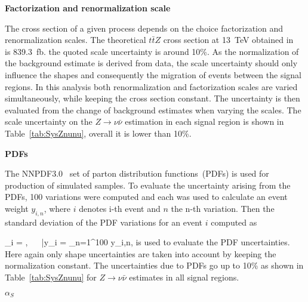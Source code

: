 \textbf{Factorization and renormalization scale}

The cross section of a given process depends on the choice factorization and renormalization scales. The theoretical $t\bar{t}Z$ cross section at 13~TeV obtained in~\cite{deFlorian:2016spz} is 839.3~fb. the quoted scale uncertainty is around 10\%. As the normalization of the background estimate is derived from data, the scale uncertainty should only influence the shapes and consequently the migration of events between the signal regions. In this analysis both renormalization and factorization scales are varied simultaneously, while keeping the cross section constant. The uncertainty is then evaluated from the change of background estimates when varying the scales. The scale uncertainty on the $Z \to \nu \bar{\nu}$ estimation in each signal region is shown in Table~\ref{tab:SysZnunu}, overall it is lower than 10\%.


\textbf{PDFs}


The NNPDF3.0~\cite{Ball:2014uwa} set of parton distribution functions~(PDFs) is used for production of simulated samples. To evaluate the uncertainty arising from the PDFs, 100 variations were computed and each was used to calculate an event weight $y_{i,n}$, where $i$ denotes i-th event and $n$ the n-th variation. Then the standard deviation of the PDF variations for an event $i$ computed as

{
\sigma_{i} = , ~~ \bar{y}_{i} =  \sum_{n=1}^{100} y_{i,n},
}
is used to evaluate the PDF uncertainties. Here again only shape uncertainties are taken into account by keeping the normalization constant. The uncertainties due to PDFs go up to 10\% as shown in Table~\ref{tab:SysZnunu} for $Z \to \nu \bar{\nu}$ estimates in all signal regions.

\textbf{$\alpha_{S}$}

